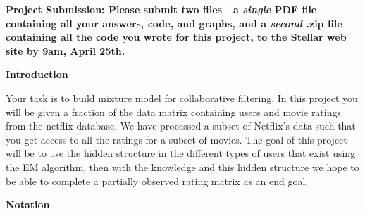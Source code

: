 

\usepackage[pdftex]{graphicx}
\usepackage{amsmath, amsthm, amssymb, amsfonts, mathtools, graphicx, enumerate}
\usepackage{times}
\usepackage{booktabs}
\usepackage{url}
\usepackage{enumerate}
\usepackage{enumitem}

\setlength{\parindent}{0pt}
\setlength{\parskip}{1ex}

\newcommand{\answer}[1]{{\mbox{}\color{red}{#1}}}
\newcommand{\emptycheck}{\text{(\hspace{-.75ex}(\hspace{3ex})\hspace{-.75ex})}}
\newcommand{\checkans}[1]{\text{(\hspace{-.75ex}(\hspace{1ex}{#1}\hspace{1ex})\hspace{-.75ex})}}
\newcommand{\argmax}{{\mbox{arg}\hspace{-.1ex}}\max}





{\bf Project Submission: Please submit two files---a \emph{single} PDF file containing all your answers, code, and graphs, and a
\emph{second} .zip file containing all the code you wrote for this
project, to
the Stellar web site by 9am, April 25th.}

\textbf{Introduction}

Your task is to build mixture model for collaborative filtering. In this project you will be given a fraction of the data matrix containing users and movie ratings from the netflix database. We have processed a subset of Netflix's data such that you get access to all the ratings for a subset of movies. The goal of this project will be to use the hidden structure in the different types of users that exist using the EM algorithm, then with the knowledge and this hidden structure we hope to be able to complete a partially observed rating matrix as an end goal.

\textbf{Notation}

